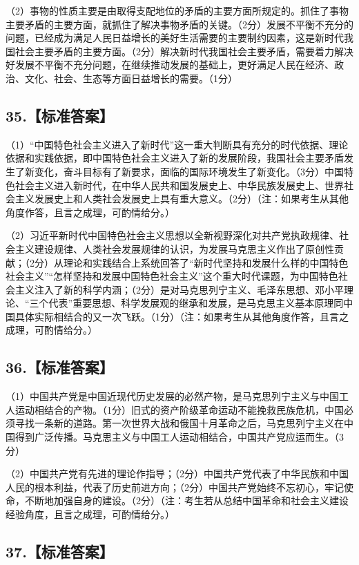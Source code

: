 \documentclass[UTF8,11pt]{ctexart}
\begin{document}
（2）事物的性质主要是由取得支配地位的矛盾的主要方面所规定的。抓住了事物主要矛盾的主要方面，就抓住了解决事物矛盾的关键。（2分）发展不平衡不充分的问题，已经成为满足人民日益增长的美好生活需要的主要制约因素，这是新时代我国社会主要矛盾的主要方面。（2分）解决新时代我国社会主要矛盾，需要着力解决好发展不平衡不充分问题，在继续推动发展的基础上，更好满足人民在经济、政治、文化、社会、生态等方面日益增长的需要。（1分）


\subsection*{35.【标准答案】}

（1）“中国特色社会主义进入了新时代”这一重大判断具有充分的时代依据、理论依据和实践依据，即中国特色社会主义进入了新的发展阶段，我国社会主要矛盾发生了新变化，奋斗目标有了新要求，面临的国际环境发生了新变化。（3分）中国特色社会主义进入新时代，在中华人民共和国发展史上、中华民族发展史上、世界社会主义发展史上和人类社会发展史上具有重大意义。（2分）（注：如果考生从其他角度作答，且言之成理，可酌情给分。）


（2）习近平新时代中国特色社会主义思想以全新视野深化对共产党执政规律、社会主义建设规律、人类社会发展规律的认识，为发展马克思主义作出了原创性贡献；（2分）从理论和实践结合上系统回答了“新时代坚持和发展什么样的中国特色社会主义”“怎样坚持和发展中国特色社会主义”这个重大时代课题，为中国特色社会主义注入了新的科学内涵；（2分）是对马克思列宁主义、毛泽东思想、邓小平理论、“三个代表”重要思想、科学发展观的继承和发展，是马克思主义基本原理同中国具体实际相结合的又一次飞跃。（1分）（注：如果考生从其他角度作答，且言之成理，可酌情给分。）


\subsection*{36.【标准答案】}

（1）中国共产党是中国近现代历史发展的必然产物，是马克思列宁主义与中国工人运动相结合的产物。（1分）旧式的资产阶级革命运动不能挽救民族危机，中国必须寻找一条新的道路。第一次世界大战和俄国十月革命之后，马克思列宁主义在中国得到广泛传播。马克思主义与中国工人运动相结合，中国共产党应运而生。（3分）


（2）中国共产党有先进的理论作指导；（2分）中国共产党代表了中华民族和中国人民的根本利益，代表了历史前进方向；（2分）中国共产党始终不忘初心，牢记使命，不断地加强自身的建设。（2分）（注：考生若从总结中国革命和社会主义建设经验角度，且言之成理，可酌情给分。）


\subsection*{37.【标准答案】}
\end{document}
